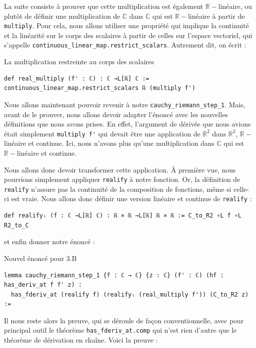 \documentclass[a4paper, 11pt, twoside]{report}
\newcommand\R{\mathbb{R}}
\newcommand\C{\mathbb{C}}
\begin{document}
La suite consiste à prouver que cette multiplication est également $\R-$linéaire, ou plutôt de définir une multiplication de $\C$ dans $\C$ qui est $\R-$linéaire à partir de \verb|multiply|. Pour cela, nous allons utiliser une propriété qui implique la continuité et la linéarité sur le corps des scalaires à partir de celles sur l'espace vectoriel, qui s'appelle \verb|continuous_linear_map.restrict_scalars|. Autrement dit, on écrit :

\begin{code}{La multiplication restreinte au corps des scalaires}
\begin{lstlisting}
def real_multiply (f' : ℂ) : ℂ →L[ℝ] ℂ :=
continuous_linear_map.restrict_scalars ℝ (multiply f')
\end{lstlisting}
\end{code}

\bigskip

Nous allons maintenant pouvoir revenir à notre \verb|cauchy_riemann_step_1|. Mais, avant de le prouver, nous allons devoir adapter l'énoncé avec les nouvelles définitions que nous avons prises. En effet, l'argument de dérivée que nous avions était simplement \verb|multiply f'| qui devait être une application de $\R^2$ dans $\R^2$, $\R-$linéaire et continue. Ici, nous n'avons plus qu'une multiplication dans $\C$ qui est $\R-$linéaire et continue.

Nous allons donc devoir transformer cette application. À première vue, nous pourrions simplement appliquer \verb|realify| à notre fonction. Or, la définition de \verb|realify| n'assure pas la continuité de la composition de fonctions, même si celle-ci est vraie. Nous allons donc définir une version linéaire et continue de \verb|realify| :

\begin{lstlisting}
def realifyₗ (f : ℂ →L[ℝ] ℂ) : ℝ × ℝ →L[ℝ] ℝ × ℝ := C_to_R2 ∘L f ∘L R2_to_C
\end{lstlisting}

et enfin donner notre énoncé :

\begin{code}{Nouvel énoncé pour 3.B}
\begin{lstlisting}
lemma cauchy_riemann_step_1 {f : ℂ → ℂ} {z : ℂ} (f' : ℂ) (hf : has_deriv_at f f' z) : 
  has_fderiv_at (realify f) (realifyₗ (real_multiply f')) (C_to_R2 z) := 
\end{lstlisting}
\end{code}

Il nous reste alors la preuve, qui se déroule de façon conventionnelle, avec pour principal outil le théorème \verb|has_fderiv_at.comp| qui n'est rien d'autre que le théorème de dérivation en chaîne. Voici la preuve :
\end{document}
